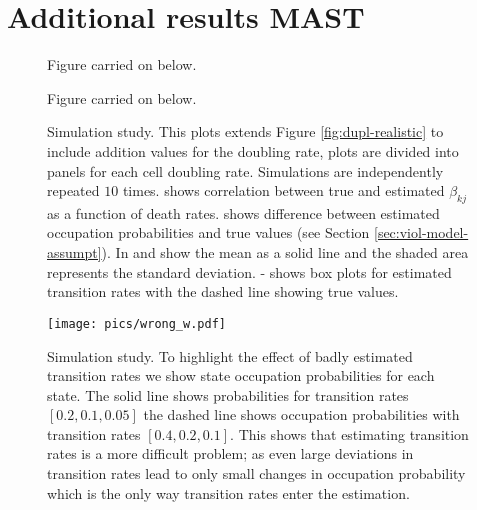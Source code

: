 \chapter{Additional results MAST}





\begin{figure}[h]
  \centering
\caption{Figure carried on below.}    
    \label{fig:dupl-all}
\end{figure}

\begin{figure}
  \ContinuedFloat
  \centering
  \caption{Figure carried on below.}
  \label{fig:dupl-all}
\end{figure}

\clearpage
\thispagestyle{empty}
\begin{figure}
  \ContinuedFloat
  \centering
  \caption{Simulation study. This plots extends Figure \ref{fig:dupl-realistic} to include addition values for the doubling rate, plots are divided into panels for each cell doubling rate. Simulations are independently repeated $10$ times.  shows correlation between true and estimated $\beta_{kj}$ as a function of death rates.  shows difference between estimated occupation probabilities and true values (see Section \ref{sec:viol-model-assumpt}). In  and  show the mean as a solid line and the shaded area represents the standard deviation.  -  shows box plots for estimated transition rates with the dashed line showing true values.}
  \label{fig:dupl-all}
\end{figure}
\clearpage

\begin{figure}
  \centering
  \texttt{[image: pics/wrong\_w.pdf]}
  \caption{Simulation study. To highlight the effect of badly estimated transition rates we show state occupation probabilities for each state. The solid line shows probabilities for transition rates $[0.2, 0.1, 0.05]$ the dashed line shows occupation probabilities with transition rates $[0.4, 0.2, 0.1]$. This shows  that estimating transition rates is a more difficult problem; as even large deviations in transition rates lead to only small changes in occupation probability which is the only way transition rates enter the estimation. }
  \label{fig:wrong_w}
\end{figure}

